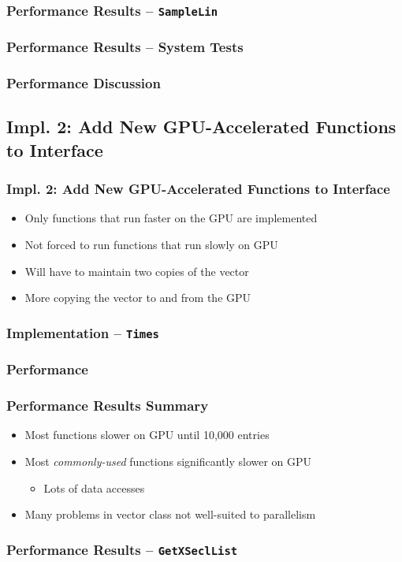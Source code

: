 \documentclass{beamer}
\newcommand{\textapprox}{\raisebox{0.5ex}{\texttildelow}}
\newcommand\pro{\item[$+$]}
\newcommand\con{\item[$-$]}
\begin{document}
\begin{frame}
\frametitle{Performance Results -- \texttt{SampleLin}}
\end{frame}

\begin{frame}
\frametitle{Performance Results -- System Tests}
\end{frame}

\begin{frame}
\frametitle{Performance Discussion}
\end{frame}


\subsection{Impl. 2: Add New GPU-Accelerated Functions to Interface}
\begin{frame}
\frametitle{Impl. 2: Add New GPU-Accelerated Functions to Interface}
\begin{itemize}
\pro Only functions that run faster on the GPU are implemented
\pro Not forced to run functions that run slowly on GPU
\con Will have to maintain two copies of the vector
\con More copying the vector to and from the GPU
\end{itemize}
\end{frame}

\begin{frame}
\frametitle{Implementation -- \texttt{Times}}
\end{frame}

\subsubsection{Performance}
\begin{frame}
\frametitle{Performance Results Summary}
\begin{itemize}
\item Most functions slower on GPU until \textapprox 10,000 entries 
\item Most \emph{commonly-used} functions significantly slower on GPU
\begin{itemize}
\item Lots of data accesses
\end{itemize}
\item Many problems in vector class not well-suited to parallelism
\end{itemize}
\end{frame}

\begin{frame}
\frametitle{Performance Results -- \texttt{GetXSeclList}}
\end{frame}
\end{document}
